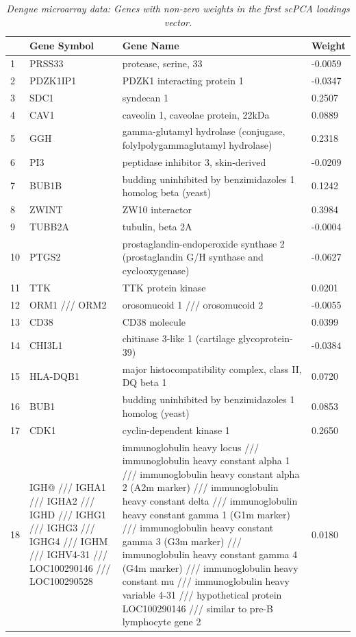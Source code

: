 \documentclass{article}
\begin{document}
\begin{longtable}{| l | p{4cm} | p{8cm} | l |}
  \caption{{\em Dengue microarray data: Genes with non-zero weights in the first scPCA loadings vector.}}
  \label{tab:dengue_1} \\
  \hline
    & Gene Symbol & Gene Name & Weight \\ 
  \hline
  \endhead
  1 & PRSS33 & protease, serine, 33 & -0.0059 \\ 
  2 & PDZK1IP1 & PDZK1 interacting protein 1 & -0.0347 \\ 
  3 & SDC1 & syndecan 1 & 0.2507 \\ 
  4 & CAV1 & caveolin 1, caveolae protein, 22kDa & 0.0889 \\ 
  5 & GGH & gamma-glutamyl hydrolase (conjugase, folylpolygammaglutamyl hydrolase) & 0.2318 \\ 
  6 & PI3 & peptidase inhibitor 3, skin-derived & -0.0209 \\ 
  7 & BUB1B & budding uninhibited by benzimidazoles 1 homolog beta (yeast) & 0.1242 \\ 
  8 & ZWINT & ZW10 interactor & 0.3984 \\ 
  9 & TUBB2A & tubulin, beta 2A & -0.0004 \\ 
  10 & PTGS2 & prostaglandin-endoperoxide synthase 2 (prostaglandin G/H synthase and cyclooxygenase) & -0.0627 \\ 
  11 & TTK & TTK protein kinase & 0.0201 \\ 
  12 & ORM1 /// ORM2 & orosomucoid 1 /// orosomucoid 2 & -0.0055 \\ 
  13 & CD38 & CD38 molecule & 0.0399 \\ 
  14 & CHI3L1 & chitinase 3-like 1 (cartilage glycoprotein-39) & -0.0384 \\ 
  15 & HLA-DQB1 & major histocompatibility complex, class II, DQ beta 1 & 0.0720 \\ 
  16 & BUB1 & budding uninhibited by benzimidazoles 1 homolog (yeast) & 0.0853 \\ 
  17 & CDK1 & cyclin-dependent kinase 1 & 0.2650 \\ 
  18 & IGH@ /// IGHA1 /// IGHA2 /// IGHD /// IGHG1 /// IGHG3 /// IGHG4 /// IGHM /// IGHV4-31 /// LOC100290146 /// LOC100290528 & immunoglobulin heavy locus /// immunoglobulin heavy constant alpha 1 /// immunoglobulin heavy constant alpha 2 (A2m marker) /// immunoglobulin heavy constant delta /// immunoglobulin heavy constant gamma 1 (G1m marker) /// immunoglobulin heavy constant gamma 3 (G3m marker) /// immunoglobulin heavy constant gamma 4 (G4m marker) /// immunoglobulin heavy constant mu /// immunoglobulin heavy variable 4-31 /// hypothetical protein LOC100290146 /// similar to pre-B lymphocyte gene 2 & 0.0180 \\ 

\end{longtable}
\end{document}
